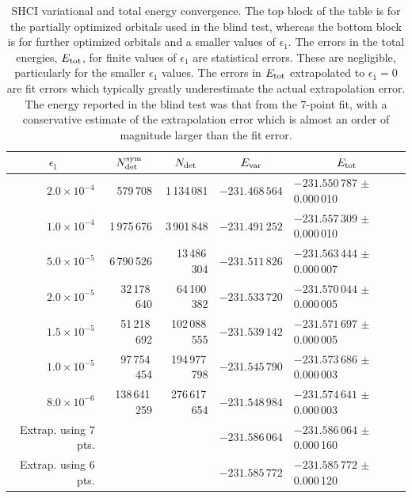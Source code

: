 \documentclass[journal=jcp,manuscript=suppinfo]{achemso}
\begin{document}
%
\begin{table}[ht!]
\begin{center}
\caption{SHCI variational and total energy convergence.  The top block of the table is for the
partially optimized orbitals used in the blind test, whereas the bottom block is for further optimized orbitals
and a smaller values of $\epsilon_1$.  The errors in the total energies, $E_{\rm tot}$, for finite values of $\epsilon_1$ are
statistical errors.  These are negligible, particularly for the smaller $\epsilon_1$ values.
The errors in $E_{\rm tot}$ extrapolated to $\epsilon_1=0$ are fit errors
which typically greatly underestimate the actual extrapolation error.  The energy reported in the blind test was that from the
7-point fit, with a conservative estimate of the extrapolation error which is almost an order of magnitude larger
than the fit error.}
\label{shci_energies}
\begin{tabular}{rrrll}
\toprule
\multicolumn{1}{c}{$\epsilon_1$} & \multicolumn{1}{c}{$N^{\rm sym}_{\rm det}$} & \multicolumn{1}{c}{$N_{\rm det}$} & \multicolumn{1}{c}{$E_{\rm var}$} & \multicolumn{1}{c}{$E_{\rm tot}$} \\
\midrule
$2.0 \times 10^{-4}$ &      579\,708 &   1\,134\,081 & $-231.468\,564$   & $-231.550\,787$ $\pm$ 0.000\,010 \\
$1.0 \times 10^{-4}$ &   1\,975\,676 &   3\,901\,848 & $-231.491\,252$   & $-231.557\,309$ $\pm$ 0.000\,010 \\
$5.0 \times 10^{-5}$ &   6\,790\,526 &  13\,486\,304 & $-231.511\,826$   & $-231.563\,444$ $\pm$ 0.000\,007 \\
$2.0 \times 10^{-5}$ &  32\,178\,640 &  64\,100\,382 & $-231.533\,720$   & $-231.570\,044$ $\pm$ 0.000\,005 \\
$1.5 \times 10^{-5}$ &  51\,218\,692 & 102\,088\,555 & $-231.539\,142$   & $-231.571\,697$ $\pm$ 0.000\,005 \\
$1.0 \times 10^{-5}$ &  97\,754\,454 & 194\,977\,798 & $-231.545\,790$   & $-231.573\,686$ $\pm$ 0.000\,003 \\
$8.0 \times 10^{-6}$ & 138\,641\,259 & 276\,617\,654 & $-231.548\,984$   & $-231.574\,641$ $\pm$ 0.000\,003 \\
Extrap. using 7 pts. &&&                               $-231.586\,064$   & $-231.586\,064$ $\pm$ 0.000\,160 \\
Extrap. using 6 pts. &&&                               $-231.585\,772$   & $-231.585\,772$ $\pm$ 0.000\,120 \\

\end{tabular}
\end{center}
\end{table}
\end{document}
